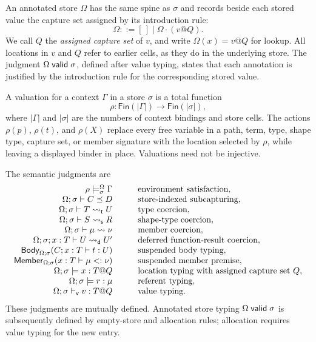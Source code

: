 \documentclass[acmsmall,screen,nonacm]{acmart}
\begin{document}
An annotated store \(\Omega\) has the same spine as \(\sigma\) and records
beside each stored value the capture set assigned by its introduction rule:
\[
  \Omega ::= [\,] \mid \Omega\mathbin{\cdot}(v@Q).
\]
We call \(Q\) the \emph{assigned capture set} of \(v\), and write
\(\Omega(x)=v@Q\) for lookup. All locations in \(v\) and \(Q\)
refer to earlier cells, as they do in the underlying store. The judgment
\(\Omega\mathrel{\mathsf{valid}}\sigma\), defined after value typing, states
that each annotation is justified by the introduction rule for the
corresponding stored value.

A valuation for a context \(\Gamma\) in a store \(\sigma\) is a total function
\[
  \rho : \mathsf{Fin}(|\Gamma|)\longrightarrow
         \mathsf{Fin}(|\sigma|),
\]
where \(|\Gamma|\) and \(|\sigma|\) are the numbers of context bindings and
store cells. The actions \(\rho(p)\), \(\rho(t)\), and \(\rho(X)\) replace
every free variable in a path, term, type, shape type, capture set, or member
signature with the location selected by \(\rho\), while leaving a displayed
binder in place. Valuations need not be injective.

The semantic judgments are
\[
\begin{array}{rcll}
 \rho\models^\Omega_\sigma\Gamma
   &&& \text{environment satisfaction},\\
 \Omega;\sigma\vdash C\mathrel{\preceq} D
   &&& \text{store-indexed subcapturing},\\
 \Omega;\sigma\vdash T\mathrel{\rightsquigarrow_{\mathsf t}} U
   &&& \text{type coercion},\\
 \Omega;\sigma\vdash S\mathrel{\rightsquigarrow_{\mathsf s}} R
   &&& \text{shape-type coercion},\\
 \Omega;\sigma\vdash\mu\mathrel{\rightsquigarrow}\nu
   &&& \text{member coercion},\\
 \Omega;\sigma;x:T\vdash U\rightsquigarrow_{\mathsf d}U'
   &&& \text{deferred function-result coercion},\\
 \mathsf{Body}_{\Omega;\sigma}({C}; {x:T}\vdash {t} : {U})
   &&& \text{suspended body typing},\\
 \mathsf{Member}_{\Omega;\sigma}(x:T\vdash\mu<:\nu)
   &&& \text{suspended member premise},\\
 \Omega;\sigma\models x:T@Q
   &&& \text{location typing with assigned capture set }Q,\\
 \Omega;\sigma\models r:\mu
   &&& \text{referent typing},\\
 \Omega;\sigma\vdash_{\mathsf v}v:T@Q
   &&& \text{value typing}.
\end{array}
\]
These judgments are mutually defined. Annotated store typing
\(\Omega\mathrel{\mathsf{valid}}\sigma\) is subsequently defined by empty-store and allocation
rules; allocation requires value typing for the new entry.
\end{document}

